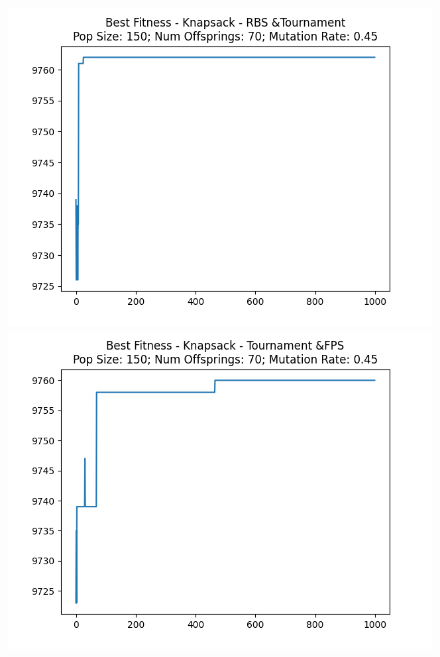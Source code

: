 \documentclass[12pt]{report}
\theoremstyle{mytheoremstyle}
\theoremstyle{mytheoremstyle}
\theoremstyle{myproblemstyle}
\begin{document}
\begin{figure}[!]
\begin{minipage}{0.4\textwidth}
		\includegraphics[width=\linewidth]{../Analysis/BSF_Knapsack_1_2_150_70.png}
	\end{minipage}
	\hspace{\fill}
	\begin{minipage}{0.4\textwidth}
		\includegraphics[width=\linewidth]{../Analysis/BSF_Knapsack_2_0_150_70.png}
	\end{minipage}
	\vspace*{1cm}
	\begin{minipage}{0.4\textwidth}

\end{minipage}
\end{figure}
\end{document}
